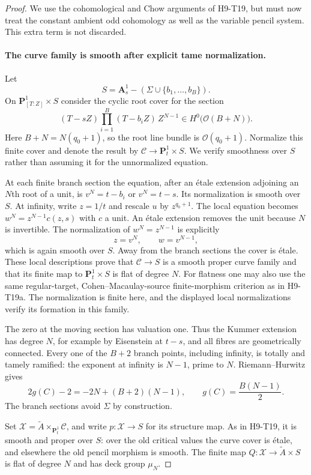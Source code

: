 \begin{proof}
We use the cohomological and Chow arguments of H9-T19, but
must now treat the constant ambient odd cohomology as well as
the variable pencil system. This extra term is not discarded.

\paragraph{The curve family is smooth after explicit tame normalization.}
Let
\[
 S=\mathbf A^1_s-(\Sigma\cup\{b_1,\ldots,b_B\}).
\]
On $\mathbf P^1_{[T:Z]}\times S$ consider the cyclic root
cover for the section
\[
 (T-sZ)\prod_{i=1}^{B}(T-b_iZ)\,Z^{N-1}
            \in H^0\bigl(\mathcal O(B+N)\bigr).
                                                               \tag{H9.103}
\]
Here $B+N=N(q_0+1)$, so the root line bundle is
$\mathcal O(q_0+1)$. Normalize this finite cover and denote
the result by $\mathscr C\to\mathbf P^1_t\times S$.
We verify smoothness over $S$ rather than assuming it for
the unnormalized equation.

At each finite branch section the equation, after an \'etale
extension adjoining an $N$th root of a unit, is
$v^N=t-b_i$ or $v^N=t-s$. Its normalization is smooth over
$S$. At infinity, write $z=1/t$ and rescale $u$ by
$z^{q_0+1}$. The local equation becomes
$w^N=z^{N-1}c(z,s)$ with $c$ a unit. An \'etale extension
removes the unit because $N$ is invertible. The normalization
of $w^N=z^{N-1}$ is explicitly
\[
                        z=v^N,\qquad w=v^{N-1},
\]
which is again smooth over $S$. Away from the branch sections
the cover is \'etale. These local descriptions prove that
$\mathscr C\to S$ is a smooth proper curve family and that
its finite map to $\mathbf P^1_t\times S$ is flat of degree
$N$. For flatness one may also use the same regular-target,
Cohen--Macaulay-source finite-morphism criterion as in
H9-T19a. The normalization is finite here, and the displayed
local normalizations verify its formation in this family.

The zero at the moving section has valuation one. Thus the
Kummer extension has degree $N$, for example by Eisenstein
at $t-s$, and all fibres are geometrically connected.
Every one of the $B+2$ branch points, including infinity,
is totally and tamely ramified: the exponent at infinity
is $N-1$, prime to $N$. Riemann--Hurwitz gives
\[
 2g(C)-2=-2N+(B+2)(N-1),
                 \qquad g(C)=\frac{B(N-1)}2.
\]
The branch sections avoid $\Sigma$ by construction.

Set
$\mathscr X=\widetilde A\times_{\mathbf P^1_t}\mathscr C$,
and write $p:\mathscr X\to S$ for its structure map.
As in H9-T19, it is smooth and proper over $S$: over the old
critical values the curve cover is \'etale, and elsewhere
the old pencil morphism is smooth. The finite map
$Q:\mathscr X\to\widetilde A\times S$ is flat of degree
$N$ and has deck group $\mu_N$.


\end{proof}
